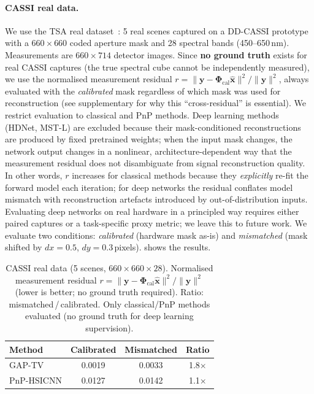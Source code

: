 \documentclass[runningheads]{llncs}
\begin{document}
\paragraph{CASSI real data.}
We use the TSA real dataset~\cite{choi2017kaist}: 5 real scenes captured on a DD-CASSI prototype with a $660 \times 660$ coded aperture mask and 28 spectral bands (450--650\,nm).
Measurements are $660 \times 714$ detector images.
Since \textbf{no ground truth} exists for real CASSI captures (the true spectral cube cannot be independently measured), we use the normalised measurement residual $r = \|\mathbf{y} - \mathbf{\Phi}_{\text{cal}}\hat{\mathbf{x}}\|^2 / \|\mathbf{y}\|^2$, always evaluated with the \emph{calibrated} mask regardless of which mask was used for reconstruction (see supplementary for why this ``cross-residual'' is essential).
We restrict evaluation to classical and PnP methods.
Deep learning methods (HDNet, MST-L) are excluded because their mask-conditioned reconstructions are produced by fixed pretrained weights; when the input mask changes, the network output changes in a nonlinear, architecture-dependent way that the measurement residual does not disambiguate from signal reconstruction quality.
In other words, $r$ increases for classical methods because they \emph{explicitly} re-fit the forward model each iteration; for deep networks the residual conflates model mismatch with reconstruction artefacts introduced by out-of-distribution inputs.
Evaluating deep networks on real hardware in a principled way requires either paired captures or a task-specific proxy metric; we leave this to future work.
We evaluate two conditions: \emph{calibrated} (hardware mask as-is) and \emph{mismatched} (mask shifted by $dx{=}0.5$, $dy{=}0.3$\,pixels).
 shows the results.

\begin{table}[t]
\centering
\caption{CASSI real data (5 scenes, $660 \times 660 \times 28$). Normalised measurement residual $r = \|\mathbf{y} - \mathbf{\Phi}_{\text{cal}}\hat{\mathbf{x}}\|^2 / \|\mathbf{y}\|^2$ (lower is better; no ground truth required). Ratio: mismatched\,/\,calibrated. Only classical/PnP methods evaluated (no ground truth for deep learning supervision).}
\label{tab:cassi_real}
\begin{tabular}{@{}lccc@{}}
\toprule
\textbf{Method} & \textbf{Calibrated} & \textbf{Mismatched} & \textbf{Ratio} \\
\midrule
GAP-TV            & 0.0019 & 0.0033 & 1.8$\times$ \\
PnP-HSICNN        & 0.0127 & 0.0142 & 1.1$\times$ \\
\bottomrule
\end{tabular}
\end{table}
\end{document}
